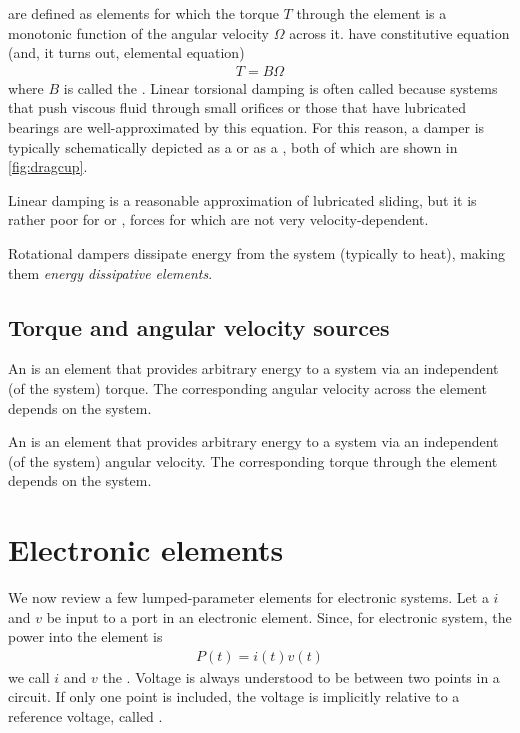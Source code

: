 \documentclass[dynamic_systems.tex]{subfiles}
\begin{document}
 are defined as elements for which the torque $T$ through the element is a monotonic function of the angular velocity $\Omega$ across it.
 have constitutive equation (and, it turns out, elemental equation)
\begin{align}
	T = B \Omega
\end{align}
where $B$ is called the .
Linear torsional damping is often called  because systems that push viscous fluid through small orifices or those that have lubricated bearings are well-approximated by this equation.
For this reason, a damper is typically schematically depicted as a  or as a , both of which are shown in \autoref{fig:dragcup}.
\tags{}

Linear damping is a reasonable approximation of lubricated sliding, but it is rather poor for  or , forces for which are not very velocity-dependent.

Rotational dampers dissipate energy from the system (typically to heat), making them \emph{energy dissipative elements}.
\tags{}

\subsection{Torque and angular velocity sources}

An  is an element that provides arbitrary energy to a system via an independent (of the system) torque.
The corresponding angular velocity across the element depends on the system.

An  is an element that provides arbitrary energy to a system via an independent (of the system) angular velocity.
The corresponding torque through the element depends on the system.

\section{Electronic elements}
\tags{}

We now review a few lumped-parameter elements for electronic systems.
Let a  $i$ and  $v$ be input to a port in an electronic element.
Since, for electronic system, the power into the element is
\begin{align}
	P(t) = i(t) v(t)
\end{align}
we call $i$ and $v$ the .
Voltage is always understood to be between two points in a circuit.
If only one point is included, the voltage is implicitly relative to a reference voltage, called .
\end{document}

